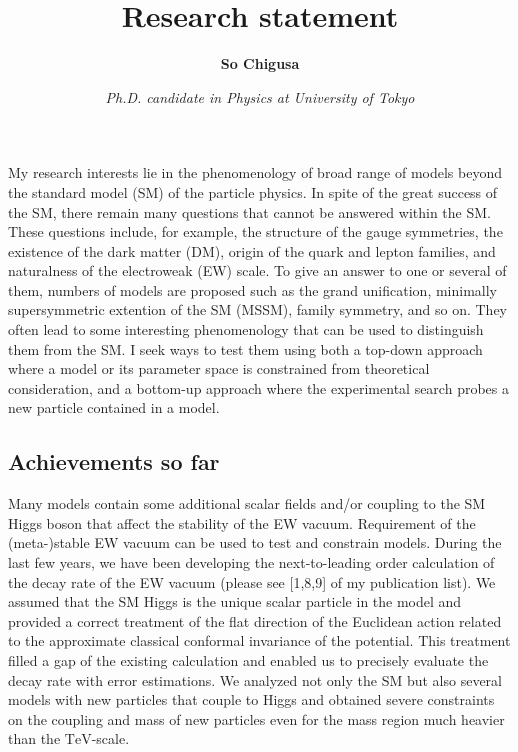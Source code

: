 \documentclass[12pt,notitlepage]{book}
\title{\vspace*{-3cm}Research statement}
\author{\textbf{So Chigusa}}
\date{\vspace*{-4mm}\textit{Ph.D. candidate in Physics at University of Tokyo}}
\begin{document}
\maketitle
\thispagestyle{fancy} %

My research interests lie in the phenomenology of broad range of models beyond the standard model (SM) of the particle physics.
In spite of the great success of the SM, there remain many questions that cannot be answered within the SM.
These questions include, for example, the structure of the gauge symmetries, the existence of the dark matter (DM), origin of the quark and lepton families, and naturalness of the electroweak (EW) scale.
To give an answer to one or several of them, numbers of models are proposed such as the grand unification, minimally supersymmetric extention of the SM (MSSM), family symmetry, and so on.
They often lead to some interesting phenomenology that can be used to distinguish them from the SM.
I seek ways to test them using both a top-down approach where a model or its parameter space is constrained from theoretical consideration, and a bottom-up approach where the experimental search probes a new particle contained in a model.

\vspace*{-2mm}
\subsection*{Achievements so far}


Many models contain some additional scalar fields and/or coupling to the SM Higgs boson that affect the stability of the EW vacuum.
Requirement of the (meta-)stable EW vacuum can be used to test and constrain models.
During the last few years, we have been developing the next-to-leading order calculation of the decay rate of the EW vacuum (please see [1,8,9] of my publication list).
We assumed that the SM Higgs is the unique scalar particle in the model and provided a correct treatment of the flat direction of the Euclidean action related to the approximate classical conformal invariance of the potential.
This treatment filled a gap of the existing calculation and enabled us to precisely evaluate the decay rate with error estimations.
We analyzed not only the SM but also several models with new particles that couple to Higgs and obtained severe constraints on the coupling and mass of new particles even for the mass
region much heavier than the $\mathrm{TeV}$-scale.
\end{document}

